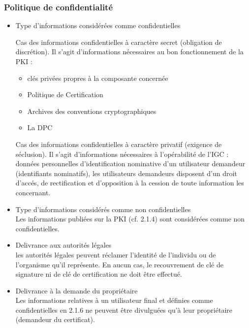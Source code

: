 \documentclass[a4paper,11pt,french]{article}
\begin{document}
\subsubsection{Politique de confidentialité}
\begin{itemize}
\item Type d'informations considérées comme confidentielles

Cas des informations confidentielles à caractère secret (obligation de discrétion). Il s’agit d’informations nécessaires au bon fonctionnement de la PKI :
\begin{itemize}
\item clés privées propres à la composante concernée
\item Politique de Certification 
\item Archives des conventions cryptographiques
\item La DPC
\\
\end{itemize}



Cas des informations confidentielles à caractère privatif (exigence de séclusion). Il s’agit d’informations nécessaires à l’opérabilité de l’IGC :
données personnelles d’identification nominative d’un utilisateur demandeur (identifiants nominatifs), les utilisateurs demandeurs disposent d'un droit d'accés, de rectification et d'opposition à la cession de toute information les concernant.
\\

\item Type d'informations considérés comme non confidentielles
\\Les informations publiées sur la PKI (cf. 2.1.4) sont considérées comme non confidentielles.
\\
\item Delivrance aux autorités légales
\\les autorités légales peuvent réclamer l’identité de l’individu ou de l’organisme qu’il représente. En aucun cas, le recouvrement de clé de signature ni de clé de certification ne doit être effectué.
\\

\item Delivrance à la demande du propriétaire
\\Les informations relatives à un utilisateur final et définies comme confidentielles en 2.1.6 ne peuvent être divulguées qu’à leur propriétaire (demandeur du certificat).
\end{itemize}
\end{document}
